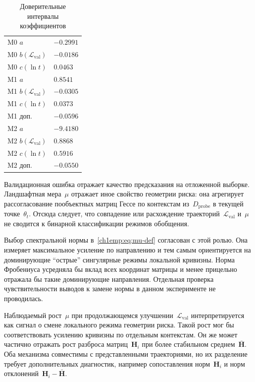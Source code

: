 \begin{table}[htbp]
\centering
\caption{Доверительные интервалы коэффициентов}
\label{ch1emp:tab:reg-coefs}
\footnotesize
\setlength{\tabcolsep}{4pt}
\begin{tabularx}{\linewidth}{|>{\raggedright\arraybackslash}p{2.75cm}|>{\raggedright\arraybackslash}X|}
\hline
M0 $a$ & $-0.2991$ \; [$-1.6756,\;0.8722$] \\
M0 $b(\mathcal{L}_{\mathrm{val}})$ & $-0.0186$ \; [$-0.0698,\;0.0451$] \\
M0 $c(\ln t)$ & $0.0463$ \; [$-0.0037,\;0.1083$] \\
\hline
M1 $a$ & $0.8541$ \; [$-0.7184,\;2.3416$] \\
M1 $b(\mathcal{L}_{\mathrm{val}})$ & $-0.0305$ \; [$-0.0774,\;0.0294$] \\
M1 $c(\ln t)$ & $0.0373$ \; [$-0.0071,\;0.0895$] \\
M1 доп. & $-0.0596$ \; [$-0.1500,\;0.0242$] \\
\hline
M2 $a$ & $-9.4180$ \; [$-12.1149,\;-6.9555$] \\
M2 $b(\mathcal{L}_{\mathrm{val}})$ & $0.8868$ \; [$0.6819,\;1.1191$] \\
M2 $c(\ln t)$ & $0.5916$ \; [$0.4503,\;0.7454$] \\
M2 доп. & $-0.0550$ \; [$-0.0684,\;-0.0438$] \\
\hline
\end{tabularx}
\end{table}

Валидационная ошибка отражает качество предсказания на отложенной выборке.
Ландшафтная мера~$\mu$ отражает иное свойство геометрии риска: она агрегирует рассогласование пообъектных матриц Гессе по контекстам из~$D_{\mathrm{probe}}$ в текущей точке~$\theta_t$.
Отсюда следует, что совпадение или расхождение траекторий~$\mathcal{L}_{\mathrm{val}}$ и~$\mu$ не сводится к бинарной классификации режимов обобщения.

Выбор спектральной нормы в~\eqref{ch1emp:eq:mu-def} согласован с этой ролью.
Она измеряет максимальное усиление по направлению и тем самым ориентируется на доминирующие ``острые'' сингулярные режимы локальной кривизны.
Норма Фробениуса усредняла бы вклад всех координат матрицы и менее прицельно отражала бы такие доминирующие направления.
Отдельная проверка чувствительности выводов к замене нормы в данном эксперименте не проводилась.

Наблюдаемый рост~$\mu$ при продолжающемся улучшении~$\mathcal{L}_{\mathrm{val}}$ интерпретируется как сигнал о смене локального режима геометрии риска.
Такой рост мог бы соответствовать усилению кривизны по отдельным контекстам.
Он же может частично отражать рост разброса матриц~$\mathbf{H}_i$ при более стабильном среднем~$\bar{\mathbf{H}}$.
Оба механизма совместимы с представленными траекториями, но их разделение требует дополнительных диагностик, например сопоставления норм~$\mathbf{H}_i$ и норм отклонений~$\mathbf{H}_i-\bar{\mathbf{H}}$.

